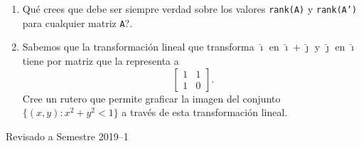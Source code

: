 \documentclass[letter,11pt]{article}
\begin{document}
\begin{enumerate}
\item \textquestiondown Qu\'e crees que debe ser siempre verdad sobre los valores \texttt{rank(A)} y \texttt{rank(A')} para cualquier matriz \texttt{A}?.

\item Sabemos que la transformaci\'on lineal que transforma $\hat{\imath}$ en $\hat{\imath} + \hat{\jmath}$ y $\hat{\jmath}$ en $\hat{\imath}$ tiene por matriz que la representa a 
$$
\begin{bmatrix}
1 & 1 \\
1 & 0
\end{bmatrix}.
$$
Cree un rutero que permite graficar la imagen del conjunto $\{(x,y):x^2+y^2<1\}$  a trav\'es de esta transformaci\'on lineal.



\end{enumerate}


\vfill
\hfill Revisado a Semestre 2019--1
\end{document}
